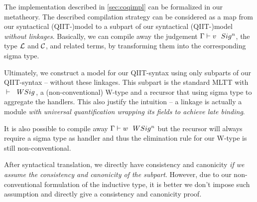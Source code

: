 The implementation described in \cref{sec:coqimpl} can be formalized in our metatheory. The described compilation strategy can be considered as a map from our syntactical (QIIT-)model to a subpart of our syntactical (QIIT-)model \textit{without linkages}. Basically, we can compile away the judgement ${ {\Gamma} \vdash {v} \ \ Sig^{n} }$, the type ${\mathcal{L}}$ and ${\mathcal{C}}$, and related terms, by transforming them into the corresponding sigma type.



Ultimately, we construct a model for our QIIT-syntax using only subparts of our QIIT-syntax -- without these linkages. This subpart is the standard MLTT with ${ {} \vdash {} \ \ WSig^{} }$, a (non-conventional) W-type and a recursor that using sigma type to aggregate the handlers. This also justify the intuition -- a linkage is actually a module \textit{with universal quantification wrapping its fields to achieve late binding}. 

It is also possible to compile away ${ {\Gamma} \vdash {w} \ \ WSig^{n} }$ but the recursor will always require a sigma type as handler and thus the elimination rule for our W-type is still non-conventional.

After syntactical translation, we directly have consistency and canonicity \textit{if we assume the consistency and canonicity of the subpart}. However, due to our non-conventional formulation of the inductive type, it is better we don't impose such assumption and directly give a consistency and canonicity proof.
